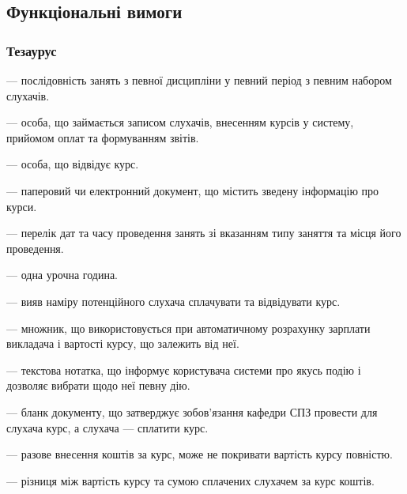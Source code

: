 \subsection{Функціональні вимоги}
\subsubsection*{Тезаурус}

\begin{description}
\setlength{\itemsep}{0pt}
\item[Курс] --- послідовність занять з певної дисципліни у певний період з певним набором слухачів.
\item[Оператор] --- особа, що займається записом слухачів, внесенням курсів у систему, прийомом оплат та формуванням звітів.
\item[Слухач] --- особа, що відвідує курс.
\item[Звіт] --- паперовий чи електронний документ, що містить зведену інформацію про курси.
\item[Розклад] --- перелік дат та часу проведення занять зі вказанням типу заняття та місця його проведення.
\item[Заняття] --- одна урочна година.
\item[Заявка] --- вияв наміру потенційного слухача сплачувати та відвідувати курс.
\item[Коефіціент] --- множник, що використовується при автоматичному розрахунку зарплати викладача і вартості курсу, що залежить від неї.
\item[Сповіщення] --- текстова нотатка, що інформує користувача системи про якусь подію і дозволяє вибрати щодо неї певну дію.
\item[Форма договору] --- бланк документу, що затверджує зобов'язання кафедри СПЗ провести для слухача курс, а слухача --- сплатити курс.
\item[Оплата] --- разове внесення коштів за курс, може не покривати вартість курсу повністю.
\item[Заборгованість] --- різниця між вартість курсу та сумою сплачених слухачем за курс коштів.


\end{description}
